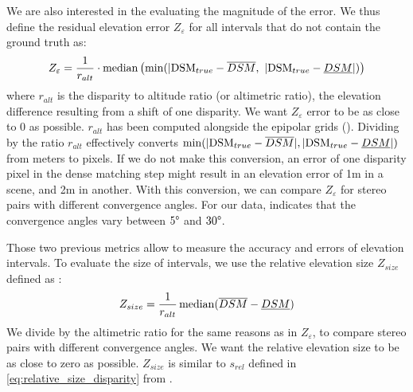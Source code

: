 We are also interested in the evaluating the magnitude of the error. We thus define the residual elevation error $Z_{\varepsilon}$ for all intervals that do not contain the ground truth as:
\begin{align}
    Z_\varepsilon=\dfrac{1}{r_{alt}} \cdot\operatorname*{median} \left( \min(|\mathrm{DSM}_{true}-\overline{DSM}, ~ |\mathrm{DSM}_{true}-\underline{DSM}|)\right)\label{eq:residual_error_elevation}
\end{align}
where $r_{alt}$ is the disparity to altitude ratio (or altimetric ratio), \ie the elevation difference resulting from a shift of one disparity. We want $Z_\varepsilon$ error to be as close to 0 as possible. $r_{alt}$ has been computed alongside the epipolar grids (). Dividing by the ratio $r_{alt}$ effectively converts $\min(|\mathrm{DSM}_{true}-\overline{DSM}|, |\mathrm{DSM}_{true}-\underline{DSM}|)$ from meters to pixels. If we do not make this conversion, an error of one disparity pixel in the dense matching step might result in an elevation error of 1m in a scene, and 2m in another. With this conversion, we can compare $Z_\varepsilon$ for stereo pairs with different convergence angles. For our data,  indicates that the convergence angles vary between $5\degree$ and $30\degree$. 

Those two previous metrics allow to measure the accuracy and errors of elevation intervals. To evaluate the size of intervals, we use the relative elevation size $Z_{size}$ defined as :
\begin{align}\label{eq:relative_size_elevation}
    Z_{size} = \dfrac{1}{r_{alt}}\operatorname*{median}(\overline{DSM}-\underline{DSM})
\end{align}
We divide by the altimetric ratio for the same reasons as in $Z_\varepsilon$, \ie to compare stereo pairs with different convergence angles. We want the relative elevation size to be as close to zero as possible. $Z_{size}$ is similar to $s_{rel}$ defined in \cref{eq:relative_size_disparity} from .

